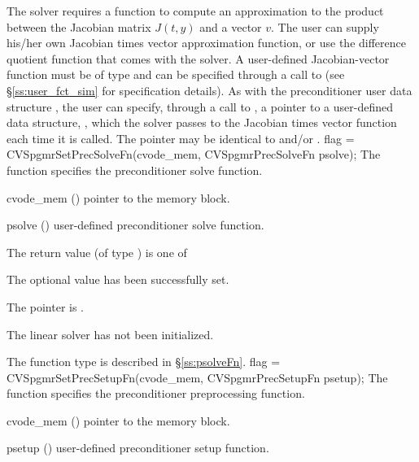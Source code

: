 The 
{\cvspgmr} solver requires a function to compute an approximation to the
product between the Jacobian matrix $J(t,y)$ and a vector $v$.
The user can supply his/her own Jacobian times vector approximation function, 
or use the difference quotient function  
that comes with the {\cvspgmr} solver.
A user-defined Jacobian-vector function must be of type  and 
can be specified through a call to  
(see \S\ref{ss:user_fct_sim} for specification details).
As with the preconditioner user data structure , 
the user can specify, through a call to , a pointer to a 
user-defined data structure, , which
the {\cvspgmr} solver passes to the Jacobian times vector function  each
time it is called.  
The pointer  may be identical to  and/or .
{
  flag = CVSpgmrSetPrecSolveFn(cvode\_mem, CVSpgmrPrecSolveFn psolve);
}
{
  The function  specifies the preconditioner
  solve function.
}
{
  \begin{args}
  \item[cvode\_mem] ()
    pointer to the {\cvode} memory block.
  \item[psolve] ()
    user-defined preconditioner solve function.
  \end{args}
}
{
  The return value  (of type ) is one of
  \begin{args}
  \item[\Id{SUCCESS}] 
    The optional value has been successfully set.
  \item[\Id{LIN\_NO\_MEM}]
    The  pointer is .
  \item[\Id{LIN\_NO\_LMEM}]
    The {\cvspgmr} linear solver has not been initialized.
  \end{args}
}
{
   The function type  is described in \S\ref{ss:psolveFn}.
}
{
  flag = CVSpgmrSetPrecSetupFn(cvode\_mem, CVSpgmrPrecSetupFn psetup);
}
{
  The function  specifies the preconditioner
  preprocessing function.
}
{
  \begin{args}
  \item[cvode\_mem] ()
    pointer to the {\cvode} memory block.
  \item[psetup] ()
    user-defined preconditioner setup function.
  \end{args}
}
